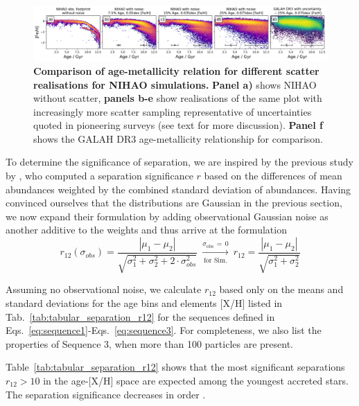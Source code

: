 \documentclass[fleqn,usenatbib]{mnras}
\begin{document}
\begin{figure}
	\includegraphics[width=\textwidth]{figures/nihao_with_scatter.png}
    \caption{
    \textbf{Comparison of age-metallicity relation for different scatter realisations for NIHAO simulations.}
    \textbf{Panel a)} shows NIHAO without scatter, \textbf{panels b-e} show realisations of the same plot with increasingly more scatter sampling representative of uncertainties quoted in pioneering surveys (see text for more discussion). \textbf{Panel f} shows the GALAH DR3 age-metallicity relationship for comparison.
    }
    \label{fig:nihao_with_scatter}
\end{figure}


To determine the significance of separation, we are inspired by the previous study by \citet{Lindegren2013}, who computed a separation significance $r$ based on the differences of mean abundances weighted by the combined standard deviation of abundances. Having convinced ourselves that the distributions are Gaussian in the previous section, we now expand their formulation by adding observational Gaussian noise as another additive to the weights and thus arrive at the formulation
\begin{equation} \label{eq:r_value}
r_{12} (\sigma_{obs}) = \frac{|\mu_1 - \mu_2|}{\sqrt{\sigma_1^2 + \sigma_2^2 + 2\cdot \sigma_{obs}^2}} ~ \xrightarrow[\text{for Sim.}]{\sigma_\text{obs}\,=\,0} ~ r_{12} = \frac{|\mu_1 - \mu_2|}{\sqrt{\sigma_1^2 + \sigma_2^2}}
\end{equation}

Assuming no observational noise, we calculate $r_{12}$ based only on the means and standard deviations for the age bins and elements {[X/H]} listed in Tab.~\ref{tab:tabular_separation_r12} for the sequences defined in Eqs.~\ref{eq:sequence1}-Eqs.~\ref{eq:sequence3}. For completeness, we also list the properties of Sequence 3, when more than 100 particles are present.

Table~\ref{tab:tabular_separation_r12} shows that the most significant separations $r_{12} > 10$ in the age-[X/H] space are expected among the youngest accreted stars. The separation significance decreases in order .
\end{document}
